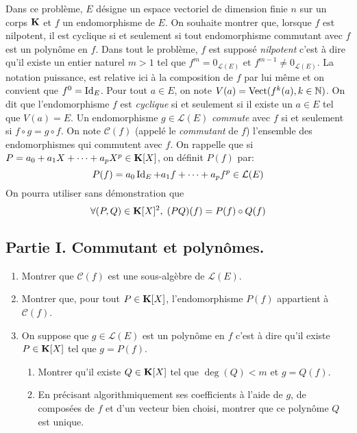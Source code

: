 Dans ce problème, $E$ désigne un espace vectoriel de dimension finie $n$ sur un corps $\mathbf{K}$ et $f$ un endomorphisme de $E$. On souhaite montrer que, lorsque $f$ est nilpotent, il est cyclique si et seulement si tout endomorphisme commutant avec $f$ est un polynôme en $f$.\newline
Dans tout le problème, $f$ est supposé \emph{nilpotent} c'est à dire qu'il existe un entier naturel $m>1$ tel que $f^m=0_{\mathcal{L}(E)}$ et $f^{m-1}\neq 0_{\mathcal{L}(E)}$. La notation puissance, est relative ici à la composition de $f$ par lui même et on convient que $f^0=\operatorname{Id}_E$.\newline
Pour tout $a\in E$, on note $V(a)=\operatorname{Vect}(f^k(a),k\in \mathbb{N})$. On dit que l'endomorphisme $f$ est \emph{cyclique} si et seulement si il existe un $a\in E$ tel que $V(a)=E$.\newline
Un endomorphisme $g\in\mathcal{L}(E)$ \emph{commute} avec $f$ si et seulement si $f\circ g = g \circ f$. On note $\mathcal{C}(f)$ (appelé le \emph{commutant} de $f$) l'ensemble des endomorphismes qui commutent avec $f$.\newline
On rappelle que si $P=a_0 + a_1X + \cdots + a_p X^p \in \mathbf{K}[X]$, on définit $P(f)$ par:
\begin{displaymath}
 P(f)= a_0\operatorname{Id}_E + a_1f +\cdots + a_pf^p\in \mathcal{L}(E)
\end{displaymath}
On pourra utiliser sans démonstration que
\begin{displaymath}
 \forall (P,Q)\in \mathbf{K}[X]^2,\; (PQ)(f) = P(f)\circ Q(f)
\end{displaymath}
\subsection*{Partie I. Commutant et polynômes.}
\begin{enumerate}
 \item Montrer que $\mathcal{C}(f)$ est une sous-algèbre de $\mathcal{L}(E)$.
 \item Montrer que, pour tout $P\in \mathbf{K}[X]$, l'endomorphisme $P(f)$ appartient à $\mathcal{C}(f)$.
 \item On suppose que $g\in \mathcal{L}(E)$ est un polynôme en $f$ c'est à dire qu'il existe $P\in \mathbf{K}[X]$ tel que $g=P(f)$.
\begin{enumerate}
 \item Montrer qu'il existe $Q\in \mathbf{K}[X]$ tel que $\deg(Q)<m$ et $g=Q(f)$.
 \item En précisant algorithmiquement ses coefficients à l'aide de $g$, de composées de $f$ et d'un vecteur bien choisi, montrer que ce polynôme $Q$ est unique. 
\end{enumerate}
\end{enumerate}

